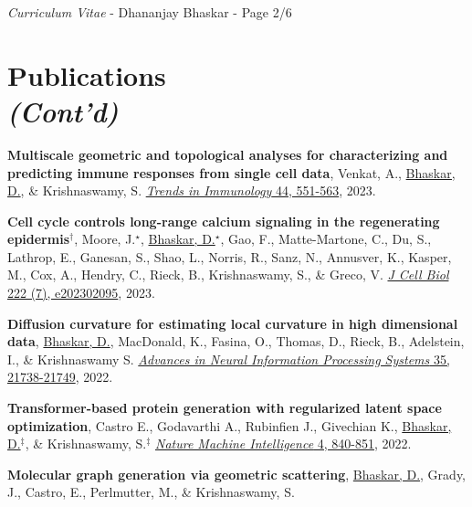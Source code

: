 \documentclass[margin,line]{res}
\begin{document}
\begin{resume}
\newpage
\begin{flushright}
\textit{Curriculum Vitae} - Dhananjay Bhaskar - Page 2/6
\end{flushright}
\vspace*{.15cm}

\section{\sc Publications\\\textit{(Cont'd)}}
{
\renewcommand\leftmargini{0em}
\begin{etaremune}[start=14]
\item{\bf Multiscale geometric and topological analyses for characterizing and predicting immune responses from single cell data},
Venkat, A., \underline{Bhaskar, D.}, \& Krishnaswamy, S.
\href{https://doi.org/10.1016/j.it.2023.05.003}{\textit{Trends in Immunology} 44, 551-563}, 2023.
\vspace*{.1cm}
\item{\bf Cell cycle controls long-range calcium signaling in the regenerating epidermis$^\dagger$}, 
Moore, J.$^\star$, \underline{Bhaskar, D.}$^\star$, Gao, F., Matte-Martone, C., Du, S., Lathrop, E., Ganesan, S., Shao, L., Norris, R., Sanz, N., Annusver, K., Kasper, M., Cox, A., Hendry, C., Rieck, B., Krishnaswamy, S., \& Greco, V.
\href{https://doi.org/10.1083/jcb.202302095}{\textit{J Cell Biol} 222 (7), e202302095}, 2023.
\vspace*{.1cm}
\item{\bf Diffusion curvature for estimating local curvature in high dimensional data},
\underline{Bhaskar, D.}, MacDonald, K., Fasina, O., Thomas, D., Rieck, B., Adelstein, I., \& Krishnaswamy S.
\href{https://proceedings.neurips.cc/paper_files/paper/2022/hash/88438dc62fc5c8777e2b5f1b4f6d37a2-Abstract-Conference.html}{\textit{Advances in Neural Information Processing Systems} 35, 21738-21749}, 2022.
\vspace*{.1cm}
\item{\bf Transformer-based protein generation with regularized latent space optimization}, 
Castro E., Godavarthi A., Rubinfien J., Givechian K., \underline{Bhaskar, D.}$^\ddagger$, \& Krishnaswamy, S.$^\ddagger$
\href{https://doi.org/10.1039/D1SM00072A}{\textit{Nature Machine Intelligence} 4, 840-851}, 2022.
\vspace*{.1cm}
\item{\bf Molecular graph generation via geometric scattering},
\underline{Bhaskar, D.}, Grady, J., Castro, E., Perlmutter, M., \& Krishnaswamy, S.

\end{etaremune}}
\end{resume}
\end{document}
